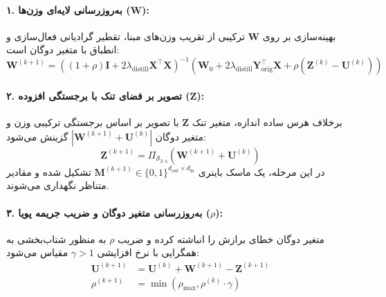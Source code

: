 \paragraph{۱. به‌روزرسانی لایه‌ای وزن‌ها ($\mathbf{W}$):}
بهینه‌سازی بر روی $\mathbf{W}$ ترکیبی از تقریب وزن‌های مبنا، تقطیر گرادیانی فعال‌سازی و انطباق با متغیر دوگان است:
\begin{equation}
\mathbf{W}^{(k+1)} = \left( (1 + \rho)\mathbf{I} + 2\lambda_{\text{distill}} \mathbf{X}^\top \mathbf{X} \right)^{-1} \left( \mathbf{W}_0 + 2\lambda_{\text{distill}} \mathbf{Y}_{\text{orig}}^\top \mathbf{X} + \rho (\mathbf{Z}^{(k)} - \mathbf{U}^{(k)}) \right)
\end{equation}

\paragraph{۲. تصویر بر فضای تنک با برجستگی افزوده ($\mathbf{Z}$):}
برخلاف هرس ساده اندازه، متغیر تنک $\mathbf{Z}$ با تصویر بر اساس برجستگی ترکیبی وزن و متغیر دوگان $|\mathbf{W}^{(k+1)} + \mathbf{U}^{(k)}|$ گزینش می‌شود:
\begin{equation}
\mathbf{Z}^{(k+1)} = \Pi_{\mathcal{S}_{2:4}}\left( \mathbf{W}^{(k+1)} + \mathbf{U}^{(k)} \right)
\end{equation}
در این مرحله، یک ماسک باینری $\mathbf{M}^{(k+1)} \in \{0, 1\}^{d_{\text{out}} \times d_{\text{in}}}$ تشکیل شده و مقادیر متناظر نگهداری می‌شوند.

\paragraph{۳. به‌روزرسانی متغیر دوگان و ضریب جریمه پویا ($\rho$):}
متغیر دوگان خطای برازش را انباشته کرده و ضریب $\rho$ به منظور شتاب‌بخشی به همگرایی با نرخ افزایشی $\gamma > 1$ مقیاس می‌شود:
\begin{align}
\mathbf{U}^{(k+1)} &= \mathbf{U}^{(k)} + \mathbf{W}^{(k+1)} - \mathbf{Z}^{(k+1)} \\
\rho^{(k+1)} &= \min\left(\rho_{\max}, \rho^{(k)} \cdot \gamma\right)
\end{align}

